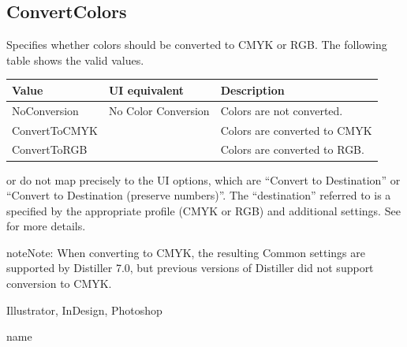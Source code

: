 \documentclass[letterpaper,12pt,english,openany,oneside]{sphinxmanual}
\begin{document}
\subsection{ConvertColors}
\label{\detokenize{PDF_Create_NewNamespaces:convertcolors}}
Specifies whether colors should be converted to CMYK or RGB. The following table shows the valid values.


\begin{savenotes}\sphinxattablestart
\centering
\begin{tabulary}{\linewidth}[t]{|T|T|T|}
\hline
\sphinxstyletheadfamily 
Value
&\sphinxstyletheadfamily 
UI equivalent
&\sphinxstyletheadfamily 
Description
\\
\hline
NoConversion
&
No Color Conversion
&
Colors are not converted.
\\
\hline
ConvertToCMYK
&
&
Colors are converted to CMYK
\\
\hline
ConvertToRGB
&
&
Colors are converted to RGB.
\\
\hline
\end{tabulary}
\par
\sphinxattableend\end{savenotes}

 or  do not map precisely to the UI options, which are “Convert to Destination” or “Convert to Destination (preserve numbers)”. The “destination” referred to is a specified by the appropriate profile (CMYK or RGB) and additional settings. See  for more details.

\begin{sphinxadmonition}{note}{Note:}
When converting to CMYK, the resulting Common settings are supported by Distiller 7.0, but previous versions of Distiller did not support conversion to CMYK.
\end{sphinxadmonition}
\label{\detokenize{PDF_Create_NewNamespaces:supported-by-6}}

Illustrator, InDesign, Photoshop

\label{\detokenize{PDF_Create_NewNamespaces:type-6}}

name

\label{\detokenize{PDF_Create_NewNamespaces:ui-name-6}}
\end{document}
